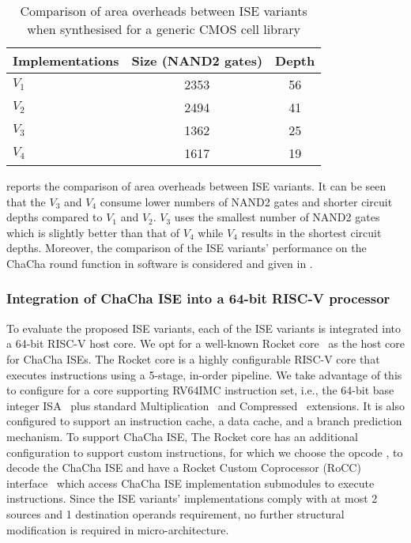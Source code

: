 \begin{table}
	\caption{Comparison of area overheads between ISE variants when synthesised for a
		generic CMOS cell library}
	\label{tab:res:hardcost1}
	\begin{tabular}{lcc}
		\toprule            
		Implementations        & Size (NAND2 gates)    & Depth  \\
		
		\midrule
		$V_1$ &     2353     & 56   \\
		$V_2$ &     2494     & 41   \\
		$V_3$ &     1362     & 25   \\
		$V_4$ &     1617     & 19   \\
		
		\bottomrule
	\end{tabular}
\end{table}

 reports the comparison of area overheads between ISE variants. It can be seen that the $V_3$ and $V_4$ consume lower numbers of NAND2 gates and shorter circuit depths compared to $V_1$ and $V_2$. $V_3$ uses the smallest number of NAND2 gates which is slightly better than that of $V_4$ while $V_4$ results in the shortest circuit depths. Moreover, the comparison of the ISE variants' performance on the ChaCha round function in software is considered and given in .

\subsubsection{Integration of ChaCha ISE into a 64-bit RISC-V processor}
\label{sec:ise:hw:sys}
To evaluate the proposed ISE variants, each of the ISE variants is integrated into a 64-bit RISC-V host core. 
We opt for a well-known Rocket core~\cite{rocket:16} as the host core for ChaCha ISEs. 
The Rocket core is a highly configurable RISC-V core that executes instructions using a 5-stage, in-order pipeline. 
We take advantage of this to configure for a core supporting RV64IMC instruction set, i.e., the 64-bit base integer ISA~\cite[Chapter 5]{RV:ISA:I} plus standard Multiplication~\cite[Chapter 7]{RV:ISA:I} and Compressed~\cite[Chapter 16]{RV:ISA:I} extensions. It is also configured to support an instruction cache, a data cache, and a branch prediction mechanism.
To support ChaCha ISE, The Rocket core has an additional configuration to support custom instructions, for which we choose the  opcode \cite[Chapter 25]{RV:ISA:I}, to decode the ChaCha ISE and have a Rocket Custom Coprocessor (RoCC) interface~\cite[Section 4]{rocket:16} which access ChaCha ISE implementation submodules to execute instructions. Since the ISE variants' implementations 
comply with at most 2 sources and 1 destination operands requirement, no further structural modification is required in micro-architecture. 

